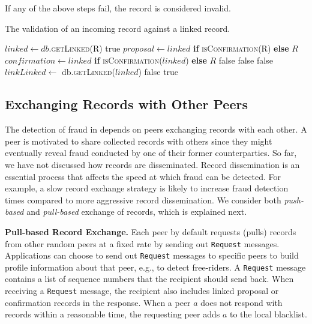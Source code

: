 If any of the above steps fail, the record is considered invalid.

\begin{algorithm}[t]
	\caption{The validation of an incoming record against a linked record.}
	\label{alg:record_validation_step3}
	\begin{algorithmic}[1]
		  
		\State $ linked \leftarrow db $.\textsc{getLinked(R)}
		\State \Return true
		\EndIf
		\State
		\State $ proposal \leftarrow linked $ \textbf{if} \textsc{isConfirmation(R)} \textbf{else} $ R $
		\State $ confirmation \leftarrow linked $ \textbf{if} \textsc{isConfirmation($ linked $)} \textbf{else} $ R $
		\State
		\State \Return false
		\EndIf
		\State \Return false
		\EndIf
		\State \Return false
		\EndIf
		\State $ linkLinked \leftarrow $ db.\textsc{getLinked(}$ linked $\textsc{)}
		\State \Return false
		\EndIf
		\State \Return true
		\EndProcedure
	\end{algorithmic}
\end{algorithm}

\subsection{Exchanging Records with Other Peers}
\label{sec:exchanging_records}
The detection of fraud in \ModelName{} depends on peers exchanging records with each other.
A peer is motivated to share collected records with others since they might eventually reveal fraud conducted by one of their former counterparties.
So far, we have not discussed how records are disseminated.
Record dissemination is an essential process that affects the speed at which fraud can be detected.
For example, a slow record exchange strategy is likely to increase fraud detection times compared to more aggressive record dissemination.
We consider both \emph{push-based} and \emph{pull-based} exchange of records, which is explained next.

\textbf{Pull-based Record Exchange.}
Each peer by default requests (pulls) records from other random peers at a fixed rate by sending out \texttt{Request} messages.
Applications can choose to send out \texttt{Request} messages to specific peers to build profile information about that peer, e.g., to detect free-riders.
A \texttt{Request} message contains a list of sequence numbers that the recipient should send back.
When receiving a \texttt{Request} message, the recipient also includes linked proposal or confirmation records in the response.
When a peer $ a $ does not respond with records within a reasonable time, the requesting peer adds $ a $ to the local blacklist.

